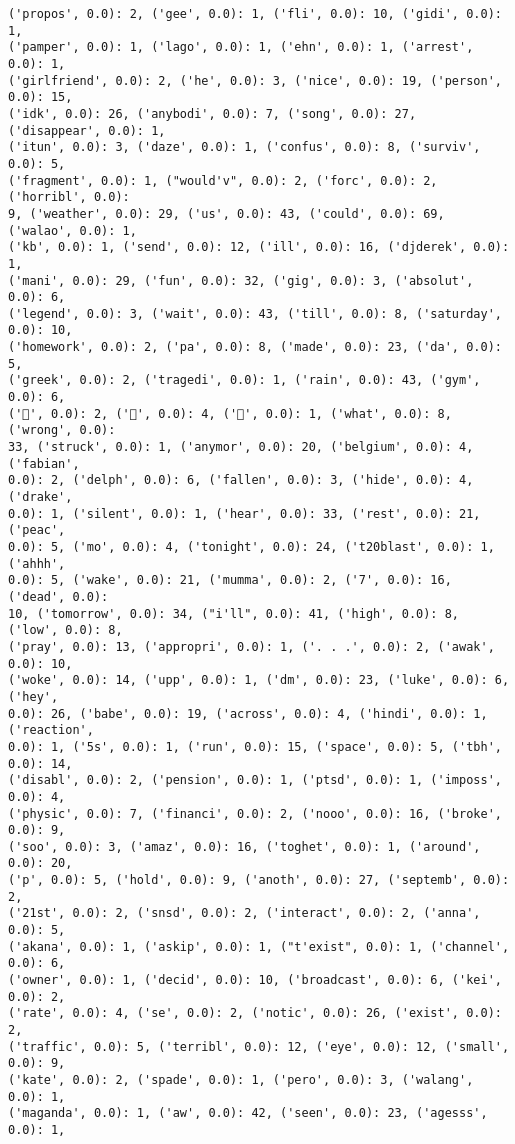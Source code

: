 \documentclass[11pt]{article}
\begin{document}
\begin{Verbatim}[commandchars=\\\{\}]
('propos', 0.0): 2, ('gee', 0.0): 1, ('fli', 0.0): 10, ('gidi', 0.0): 1,
('pamper', 0.0): 1, ('lago', 0.0): 1, ('ehn', 0.0): 1, ('arrest', 0.0): 1,
('girlfriend', 0.0): 2, ('he', 0.0): 3, ('nice', 0.0): 19, ('person', 0.0): 15,
('idk', 0.0): 26, ('anybodi', 0.0): 7, ('song', 0.0): 27, ('disappear', 0.0): 1,
('itun', 0.0): 3, ('daze', 0.0): 1, ('confus', 0.0): 8, ('surviv', 0.0): 5,
('fragment', 0.0): 1, ("would'v", 0.0): 2, ('forc', 0.0): 2, ('horribl', 0.0):
9, ('weather', 0.0): 29, ('us', 0.0): 43, ('could', 0.0): 69, ('walao', 0.0): 1,
('kb', 0.0): 1, ('send', 0.0): 12, ('ill', 0.0): 16, ('djderek', 0.0): 1,
('mani', 0.0): 29, ('fun', 0.0): 32, ('gig', 0.0): 3, ('absolut', 0.0): 6,
('legend', 0.0): 3, ('wait', 0.0): 43, ('till', 0.0): 8, ('saturday', 0.0): 10,
('homework', 0.0): 2, ('pa', 0.0): 8, ('made', 0.0): 23, ('da', 0.0): 5,
('greek', 0.0): 2, ('tragedi', 0.0): 1, ('rain', 0.0): 43, ('gym', 0.0): 6,
('💪', 0.0): 2, ('🏻', 0.0): 4, ('🐒', 0.0): 1, ('what', 0.0): 8, ('wrong', 0.0):
33, ('struck', 0.0): 1, ('anymor', 0.0): 20, ('belgium', 0.0): 4, ('fabian',
0.0): 2, ('delph', 0.0): 6, ('fallen', 0.0): 3, ('hide', 0.0): 4, ('drake',
0.0): 1, ('silent', 0.0): 1, ('hear', 0.0): 33, ('rest', 0.0): 21, ('peac',
0.0): 5, ('mo', 0.0): 4, ('tonight', 0.0): 24, ('t20blast', 0.0): 1, ('ahhh',
0.0): 5, ('wake', 0.0): 21, ('mumma', 0.0): 2, ('7', 0.0): 16, ('dead', 0.0):
10, ('tomorrow', 0.0): 34, ("i'll", 0.0): 41, ('high', 0.0): 8, ('low', 0.0): 8,
('pray', 0.0): 13, ('appropri', 0.0): 1, ('. . .', 0.0): 2, ('awak', 0.0): 10,
('woke', 0.0): 14, ('upp', 0.0): 1, ('dm', 0.0): 23, ('luke', 0.0): 6, ('hey',
0.0): 26, ('babe', 0.0): 19, ('across', 0.0): 4, ('hindi', 0.0): 1, ('reaction',
0.0): 1, ('5s', 0.0): 1, ('run', 0.0): 15, ('space', 0.0): 5, ('tbh', 0.0): 14,
('disabl', 0.0): 2, ('pension', 0.0): 1, ('ptsd', 0.0): 1, ('imposs', 0.0): 4,
('physic', 0.0): 7, ('financi', 0.0): 2, ('nooo', 0.0): 16, ('broke', 0.0): 9,
('soo', 0.0): 3, ('amaz', 0.0): 16, ('toghet', 0.0): 1, ('around', 0.0): 20,
('p', 0.0): 5, ('hold', 0.0): 9, ('anoth', 0.0): 27, ('septemb', 0.0): 2,
('21st', 0.0): 2, ('snsd', 0.0): 2, ('interact', 0.0): 2, ('anna', 0.0): 5,
('akana', 0.0): 1, ('askip', 0.0): 1, ("t'exist", 0.0): 1, ('channel', 0.0): 6,
('owner', 0.0): 1, ('decid', 0.0): 10, ('broadcast', 0.0): 6, ('kei', 0.0): 2,
('rate', 0.0): 4, ('se', 0.0): 2, ('notic', 0.0): 26, ('exist', 0.0): 2,
('traffic', 0.0): 5, ('terribl', 0.0): 12, ('eye', 0.0): 12, ('small', 0.0): 9,
('kate', 0.0): 2, ('spade', 0.0): 1, ('pero', 0.0): 3, ('walang', 0.0): 1,
('maganda', 0.0): 1, ('aw', 0.0): 42, ('seen', 0.0): 23, ('agesss', 0.0): 1,

\end{Verbatim}
\end{document}
